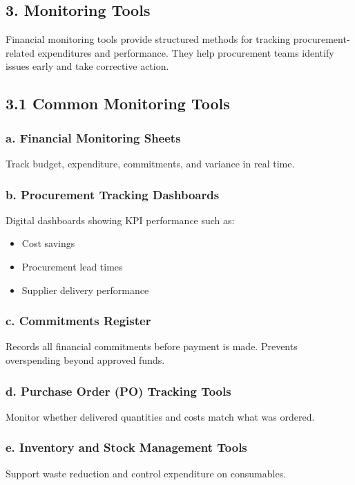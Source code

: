 \documentclass[10pt]{article}
\begin{document}
\subsection*{3. Monitoring Tools}
Financial monitoring tools provide structured methods for tracking procurement-related expenditures and performance. They help procurement teams identify issues early and take corrective action.

\subsection*{3.1 Common Monitoring Tools}
\subsubsection*{a. Financial Monitoring Sheets}
Track budget, expenditure, commitments, and variance in real time.

\subsubsection*{b. Procurement Tracking Dashboards}
Digital dashboards showing KPI performance such as:

\begin{itemize}
  \item Cost savings
  \item Procurement lead times
  \item Supplier delivery performance
\end{itemize}

\subsubsection*{c. Commitments Register}
Records all financial commitments before payment is made. Prevents overspending beyond approved funds.

\subsubsection*{d. Purchase Order (PO) Tracking Tools}
Monitor whether delivered quantities and costs match what was ordered.

\subsubsection*{e. Inventory and Stock Management Tools}
Support waste reduction and control expenditure on consumables.
\end{document}
